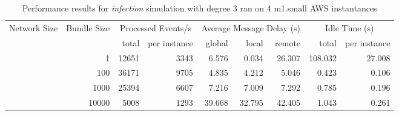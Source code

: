 \begin{table}
	  \caption[Performance results, \emph{infection:3 on 4 m1.small instances }]{ Performance results for \emph{ infection } simulation with degree 3 ran on 4 m1.small AWS instantances }
	\begin{tabular}{rrrrrrrrr}
	\hline\noalign{\smallskip}

	Network Size &
	Bundle Size &
	\multicolumn{2}{c}{Processed Events/s} & 
	\multicolumn{3}{c}{Average Message Delay (s)} & 
	\multicolumn{2}{c}{Idle Time (s)}  \\

	 & 
	 & 
	 total & per instance
     & global & local & remote
     & total & per instance\\

			
				\noalign{\smallskip}\hline
				\multirow{ 4 }{*}{ 40000 } &
				
					
					 
					\multirow{ 1 }{*}{ 1 } &
					
						
							    
							     12651  & 3343  
	                           & 6.576 & 0.034 & 26.307
	                           & 108.032 & 27.008  \\
	                
	            
					 &  
					 
					\multirow{ 1 }{*}{ 100 } &
					
						
							    
							     36171  & 9705  
	                           & 4.835 & 4.212 & 5.046
	                           & 0.423 & 0.106  \\
	                
	            
					 &  
					 
					\multirow{ 1 }{*}{ 1000 } &
					
						
							    
							     25394  & 6607  
	                           & 7.216 & 7.009 & 7.292
	                           & 0.785 & 0.196  \\
	                
	            
					 &  
					 
					\multirow{ 1 }{*}{ 10000 } &
					
						
							    
							     5008  & 1293  
	                           & 39.668 & 32.795 & 42.405
	                           & 1.043 & 0.261  \\
	                

\end{tabular}
\end{table}

